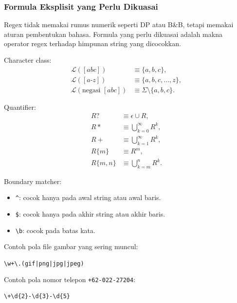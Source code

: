 \subsubsection{Formula Eksplisit yang Perlu Dikuasai}

\begin{jawab}
Regex tidak memakai rumus numerik seperti DP atau B\&B, tetapi memakai aturan pembentukan bahasa. Formula yang perlu dikuasai adalah makna operator regex terhadap himpunan string yang dicocokkan.
\end{jawab}

Character class:
\begin{align}
    \mathcal{L}([abc]) &\equiv \{a,b,c\}, \label{eq:regex-class}\\
    \mathcal{L}([a\text{-}z]) &\equiv \{a,b,c,\ldots,z\}, \label{eq:regex-range}\\
    \mathcal{L}(\text{negasi }[abc]) &\equiv \Sigma \setminus \{a,b,c\}. \label{eq:regex-negation}
\end{align}

Quantifier:
\begin{align}
    R? &\equiv \epsilon \cup R, \label{eq:regex-question}\\
    R* &\equiv \bigcup_{k=0}^{\infty} R^k, \label{eq:regex-star}\\
    R+ &\equiv \bigcup_{k=1}^{\infty} R^k, \label{eq:regex-plus}\\
    R\{m\} &\equiv R^m, \label{eq:regex-exact-repeat}\\
    R\{m,n\} &\equiv \bigcup_{k=m}^{n} R^k. \label{eq:regex-range-repeat}
\end{align}

Boundary matcher:
\begin{itemize}
    \item \texttt{\^{}}: cocok hanya pada awal string atau awal baris.
    \item \texttt{\$}: cocok hanya pada akhir string atau akhir baris.
    \item \texttt{\textbackslash b}: cocok pada batas kata.
\end{itemize}

Contoh pola file gambar yang sering muncul:
\begin{center}
\texttt{\textbackslash w+\textbackslash .(gif|png|jpg|jpeg)}
\end{center}
Contoh pola nomor telepon \texttt{+62-022-27204}:
\begin{center}
\texttt{\textbackslash +\textbackslash d\{2\}-\textbackslash d\{3\}-\textbackslash d\{5\}}
\end{center}

